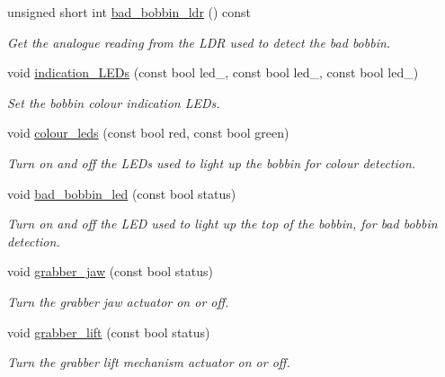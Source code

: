 \begin{DoxyCompactItemize}
unsigned short int \hyperlink{classIDP_1_1HardwareAbstractionLayer_af4a8cb5072cf89263b97a3e8e1727da8}{bad\_\-bobbin\_\-ldr} () const 
\begin{DoxyCompactList}\small\item\em Get the analogue reading from the LDR used to detect the bad bobbin. \item\end{DoxyCompactList}\item 
void \hyperlink{classIDP_1_1HardwareAbstractionLayer_a0ffde4a54900074b646efd285d9d6807}{indication\_\-LEDs} (const bool led\_, const bool led\_, const bool led\_)
\begin{DoxyCompactList}\small\item\em Set the bobbin colour indication LEDs. \item\end{DoxyCompactList}\item 
void \hyperlink{classIDP_1_1HardwareAbstractionLayer_ad2fd680723fd2d919112cad122f5c790}{colour\_\-leds} (const bool red, const bool green)
\begin{DoxyCompactList}\small\item\em Turn on and off the LEDs used to light up the bobbin for colour detection. \item\end{DoxyCompactList}\item 
void \hyperlink{classIDP_1_1HardwareAbstractionLayer_a451695e9f26f367dc58952207dac187d}{bad\_\-bobbin\_\-led} (const bool status)
\begin{DoxyCompactList}\small\item\em Turn on and off the LED used to light up the top of the bobbin, for bad bobbin detection. \item\end{DoxyCompactList}\item 
void \hyperlink{classIDP_1_1HardwareAbstractionLayer_a44d5a4c942332ba9ffe027de3dba83f0}{grabber\_\-jaw} (const bool status)
\begin{DoxyCompactList}\small\item\em Turn the grabber jaw actuator on or off. \item\end{DoxyCompactList}\item 
void \hyperlink{classIDP_1_1HardwareAbstractionLayer_a0f036b16f1f55a257c2b552035d2a1a9}{grabber\_\-lift} (const bool status)
\begin{DoxyCompactList}\small\item\em Turn the grabber lift mechanism actuator on or off. \item\end{DoxyCompactList}\end{DoxyCompactItemize}


